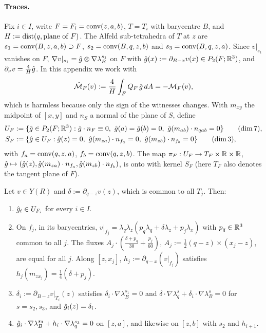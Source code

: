 \paragraph{Traces.} Fix $i\in I$, write $F=F_i=\operatorname{conv}(z,a,b)$, $T=T_i$ with barycentre $B$, and $H:=\operatorname{dist}(q,\text{plane of }F)$. The Alfeld sub-tetrahedra of $T$ at $z$ are $s_1=\operatorname{conv}(B,z,a,b)\supset F$, $s_2=\operatorname{conv}(B,q,z,b)$ and $s_3=\operatorname{conv}(B,q,z,a)$. Since $v|_{s_1}$ vanishes on $F$, $\nabla v|_{s_1}=\hat g\otimes\nabla\lambda_B^{s_1}$ on $F$ with $\hat g(x):=\partial_{B-x}v(x)\in P_2(F;\mathbb R^3)$, and $\partial_\nu v=\frac4H\hat g$. In this appendix we work with
\[
\hat{\mathcal M}_F(v):=\frac4H\int_FQ_F\,\hat g\,dA=-\mathcal M_F(v),
\]
which is harmless because only the sign of the witnesses changes. With $m_{xy}$ the midpoint of $[x,y]$ and $n_S$ a normal of the plane of $S$, define
\begin{align*}
U_F&:=\{\gh\in P_2(F;\R^3):\gh\cdot n_F\equiv0,\ \gh(a)=\gh(b)=0,\ \gh(m_{ab})\cdot n_{qab}=0\}\qquad(\dim7),\\
S_F&:=\{\gh\in U_F:\gh(z)=0,\ \gh(m_{za})\cdot n_{f_a}=0,\ \gh(m_{zb})\cdot n_{f_b}=0\}\qquad(\dim3),
\end{align*}
with $f_a=\operatorname{conv}(q,z,a)$, $f_b=\operatorname{conv}(q,z,b)$. The map $\pi_F:U_F\to T_F\times\mathbb R\times\mathbb R$, $\hat g\mapsto(\hat g(z),\hat g(m_{za})\cdot n_{f_a},\hat g(m_{zb})\cdot n_{f_b})$, is onto with kernel $S_F$ (here $T_F$ also denotes the tangent plane of $F$).

\begin{lemma}\label{k3:nec}
Let $v\in Y(R)$ and $\delta:=\partial_{q-z}v(z)$, which is common to all $T_j$. Then:
\begin{enumerate}[label=(\alph*)]
\item $\hat g_i\in U_{F_i}$ for every $i\in I$.
\item On $f_j$, in its barycentrics, $v|_{f_j}=\lambda_q\lambda_z(p_q\lambda_q+\delta\lambda_z+p_j\lambda_x)$ with $p_q\in\mathbb R^3$ common to all $j$. The fluxes $A_j\cdot(\frac{\delta+p_q}{30}+\frac{p_j}{60})$, $A_j:=\frac12(q-z)\times(x_j-z)$, are equal for all $j$. Along $[z,x_j]$, $h_j:=\partial_{q-x}(v|_{f_j})$ satisfies $h_j(m_{zx_j})=\frac14(\delta+p_j)$.
\item $\delta_i:=\partial_{B-z}v|_{T_i}(z)$ satisfies $\delta_i\cdot\nabla\lambda_B^{s_1}=0$ and $\delta\cdot\nabla\lambda_q^s+\delta_i\cdot\nabla\lambda_B^s=0$ for $s=s_2,s_3$, and $\hat g_i(z)=\delta_i$.
\item $\hat g_i\cdot\nabla\lambda_B^{s_3}+h_i\cdot\nabla\lambda_q^{s_3}=0$ on $[z,a]$, and likewise on $[z,b]$ with $s_2$ and $h_{i+1}$.
\end{enumerate}
\end{lemma}

